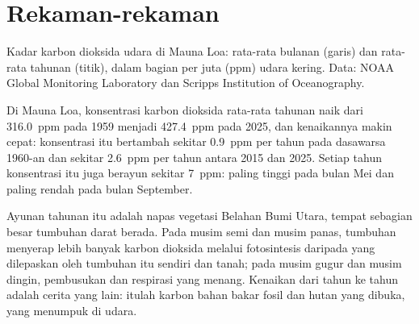 \section{Rekaman-rekaman}

\begin{omfigure}

{\small Kadar karbon dioksida udara di Mauna Loa: rata-rata bulanan (garis)
dan rata-rata tahunan (titik), dalam bagian per juta (ppm) udara kering. Data:
NOAA Global Monitoring Laboratory dan Scripps Institution of Oceanography.}
\end{omfigure}

\begin{proposition}\label{prop:g12:climate-change:co2}
Di Mauna Loa, konsentrasi karbon dioksida rata-rata tahunan naik dari
\qty{316.0}{ppm} pada 1959 menjadi \qty{427.4}{ppm} pada 2025, dan kenaikannya
makin cepat: konsentrasi itu bertambah sekitar \qty{0.9}{ppm} per tahun pada
dasawarsa 1960-an dan sekitar \qty{2.6}{ppm} per tahun antara 2015 dan 2025.
Setiap tahun konsentrasi itu juga berayun sekitar \qty{7}{ppm}: paling tinggi
pada bulan Mei dan paling rendah pada bulan September.
\end{proposition}

\begin{remark}\label{rem:g12:climate-change:teeth}
Ayunan tahunan itu adalah napas vegetasi Belahan Bumi Utara, tempat sebagian
besar tumbuhan darat berada. Pada musim semi dan musim panas, tumbuhan menyerap
lebih banyak karbon dioksida melalui fotosintesis daripada yang dilepaskan oleh
tumbuhan itu sendiri dan tanah; pada musim gugur dan musim dingin, pembusukan
dan respirasi yang menang. Kenaikan dari tahun ke tahun adalah cerita yang
lain: itulah karbon bahan bakar fosil dan hutan yang dibuka, yang menumpuk di
udara.
\end{remark}

